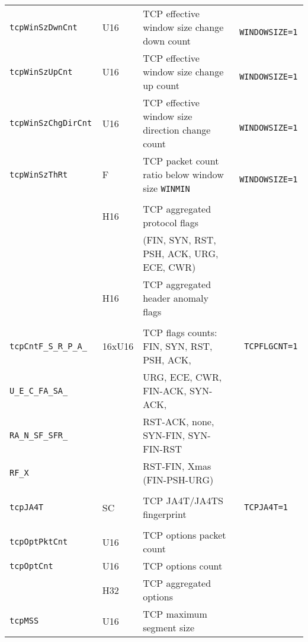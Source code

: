 \documentclass[documentation]{subfiles}
\begin{document}
\begin{longtable}{>{\tt}lll>{\tt\small}l}
    tcpWinSzDwnCnt                   & U16        & TCP effective window size change down count           & WINDOWSIZE=1\\
    tcpWinSzUpCnt                    & U16        & TCP effective window size change up count             & WINDOWSIZE=1\\
    tcpWinSzChgDirCnt                & U16        & TCP effective window size direction change count      & WINDOWSIZE=1\\
    tcpWinSzThRt                     & F          & TCP packet count ratio below window size {\tt WINMIN} & WINDOWSIZE=1\\
    \\
    \nameref{tcpFlags}               & H16        & TCP aggregated protocol flags                         & \\
                                     &            & (FIN, SYN, RST, PSH, ACK, URG, ECE, CWR)              & \\
    \nameref{tcpAnomaly}             & H16        & TCP aggregated header anomaly flags                   & \\
    \\
    tcpCntF\_S\_R\_P\_A\_            & 16xU16     & TCP flags counts: FIN, SYN, RST, PSH, ACK,            & TCPFLGCNT=1\\
    \qquad U\_E\_C\_FA\_SA\_         &            & \quad URG, ECE, CWR, FIN-ACK, SYN-ACK,                & \\
    \qquad RA\_N\_SF\_SFR\_          &            & \quad RST-ACK, none, SYN-FIN, SYN-FIN-RST             & \\
    \qquad RF\_X                     &            & \quad RST-FIN, Xmas (FIN-PSH-URG)                     & \\
    \\
    tcpJA4T                          & SC         & TCP JA4T/JA4TS fingerprint                            & TCPJA4T=1\\
    \\
    tcpOptPktCnt                     & U16        & TCP options packet count                              & \\
    tcpOptCnt                        & U16        & TCP options count                                     & \\
    \nameref{tcpOptions}             & H32        & TCP aggregated options                                & \\
    tcpMSS                           & U16        & TCP maximum segment size                              & \\

\end{longtable}
\end{document}
